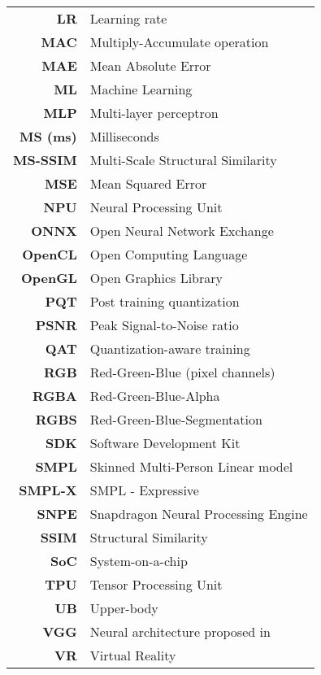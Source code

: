 \begin{changemargin}{-1.5cm}{0cm}
\begin{tabular}{>{\bf}r l@{}}
	LR & Learning rate \\
	MAC & Multiply-Accumulate operation \\
	MAE & Mean Absolute Error \\
	ML & Machine Learning \\
	MLP & Multi-layer perceptron \\
	MS (ms) & Milliseconds \\
	MS-SSIM & Multi-Scale Structural Similarity \\
	MSE & Mean Squared Error \\
	NPU & Neural Processing Unit \\
	ONNX & Open Neural Network Exchange \\
	OpenCL & Open Computing Language \\
	OpenGL & Open Graphics Library \\
	PQT & Post training quantization \\
	PSNR & Peak Signal-to-Noise ratio \\
	QAT & Quantization-aware training \\
	RGB & Red-Green-Blue (pixel channels) \\
	RGBA & Red-Green-Blue-Alpha \\
	RGBS & Red-Green-Blue-Segmentation \\
	SDK & Software Development Kit \\
	SMPL & Skinned Multi-Person Linear model \cite{dnn:smpl15} \\
	SMPL-X & SMPL - Expressive \cite{dnn:smplx19}\\
	SNPE & Snapdragon Neural Processing Engine \\
	SSIM & Structural Similarity \\
	SoC & System-on-a-chip \\
	TPU & Tensor Processing Unit \\
	UB & Upper-body \\
	VGG & Neural architecture proposed in \cite{dnn:vgg14}\\
	VR & Virtual Reality \\
\end{tabular}
\end{changemargin}

